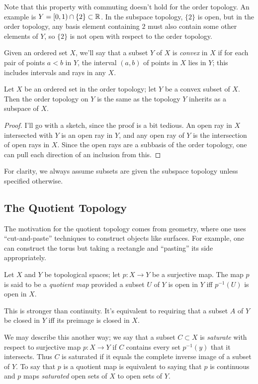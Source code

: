 \documentclass[10pt]{report}
\begin{document}
Note that this property with commuting doesn't hold for the order topology. 
An example is $Y = [0,1) \cap \{2\} \subset \mathbb{R}$. 
In the subspace topology, $\{2\}$ is open, but in the order topology, any basis element containing $2$ must also contain some other elements of $Y$, so $\{2\}$ is not open with respect to the order topology.

Given an ordered set $X$, we'll say that a subset $Y$ of $X$ is \emph{convex} in $X$ if for each pair of points $a<b$ in $Y$, the interval $(a,b)$ of points in $X$ lies in $Y$; this includes intervals and rays in any $X$.

\begin{theorem}
  Let $X$ be an ordered set in the order topology; let $Y$ be a convex subset of $X$.
  Then the order topology on $Y$ is the same as the topology $Y$ inherits as a subspace of $X$.
\end{theorem}
\begin{proof}
  I'll go with a sketch, since the proof is a bit tedious.
  An open ray in $X$ intersected with $Y$ is an open ray in $Y$, and any open ray of $Y$ is the intersection of open rays in $X$.
  Since the open rays are a subbasis of the order topology, one can pull each direction of an inclusion from this.
\end{proof}

For clarity, we always assume subsets are given the subspace topology unless specified otherwise.

\newpage
\subsection{The Quotient Topology}
The motivation for the quotient topology comes from geometry, where one uses ``cut-and-paste'' techniques to construct objects like surfaces.
For example, one can construct the torus but taking a rectangle and ``pasting'' its side appropriately.

\begin{definition}
  Let $X$ and $Y$ be topological spaces; let $p:X \rightarrow Y$ be a surjective map.
  The map $p$ is said to be a \emph{quotient map} provided a subset $U$ of $Y$ is open in $Y$ iff $p^{-1}(U)$ is open in $X$.
\end{definition}

This is stronger than continuity.
It's equivalent to requiring that a subset $A$ of $Y$ be closed in $Y$ iff its preimage is closed in $X$.

We may describe this another way; we say that a subset $C \subset X$ is \emph{saturate} with respect to surjective map $p:X \rightarrow Y$ if $C$ contains every set $p^{-1}(y)$ that it intersects.
Thus $C$ is saturated if it equals the complete inverse image of a subset of $Y$.
To say that $p$ is a quotient map is equivalent to saying that $p$ is continuous and $p$ maps \emph{saturated} open sets of $X$ to open sets of $Y$.
\end{document}
